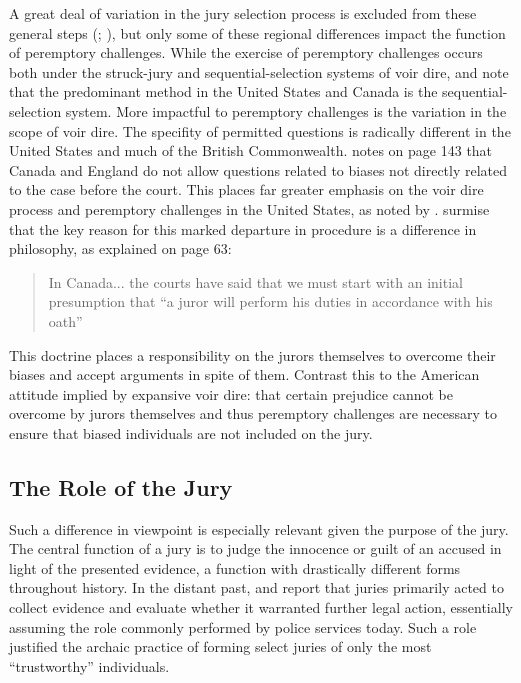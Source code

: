 A great deal of variation in the jury selection process is excluded from these general steps (\cite{vandykejurysel}; \cite{hansvidjudging}), but only some of these regional differences impact the function of peremptory challenges. While the exercise of peremptory challenges occurs both under the struck-jury and sequential-selection systems of voir dire, \cite{ford2010} and \cite{vandykejurysel} note that the predominant method in the United States and Canada is the sequential-selection system. More impactful to peremptory challenges is the variation in the scope of voir dire. The specifity of permitted questions is
radically different in the United States and much of the British
Commonwealth. \cite{vandykejurysel} notes on page 143 that Canada and
England do not allow questions related to biases not directly related to the case before the court. This places far greater emphasis on the voir dire
process and peremptory challenges in the United States, as noted by \cite{hansvidjudging}. \cite{hansvidjudging} surmise that the key reason for this
marked departure in procedure is a difference in philosophy, as explained on page 63:

\begin{quote}
  In Canada... the courts have said that we must start with an initial presumption that ``a juror will perform his
  duties in accordance with his oath''
\end{quote}

This doctrine places a responsibility on the jurors themselves to overcome their biases and accept arguments in spite of
them. Contrast this to the American attitude implied by expansive voir dire: that certain prejudice cannot be
overcome by jurors themselves and thus peremptory challenges are necessary to ensure that biased individuals are not included on
the jury.

\subsection{The Role of the Jury} \label{sec:rolejur}

Such a difference in viewpoint is especially relevant given the purpose of the jury. The central function of a jury is to judge
the innocence or guilt of an accused in light of the presented evidence, a function with drastically different forms throughout history. In the distant past, \cite{vonmosch1921} and \cite{hoffman1997} report that juries primarily acted to collect
evidence and evaluate whether it warranted further legal action, essentially assuming the role commonly performed by police
services today. Such a role justified the archaic practice of forming select juries of only the most ``trustworthy'' individuals.

